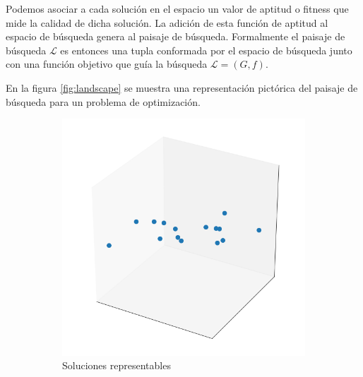 Podemos asociar a cada solución en el espacio un valor de aptitud o fitness que mide la calidad de dicha solución. La adición de esta función de aptitud al espacio de búsqueda genera al paisaje de búsqueda. Formalmente el paisaje de búsqueda $\mathcal{L}$ es entonces una tupla conformada por el espacio de búsqueda junto con una función objetivo que guía la búsqueda $\mathcal{L}=(G,f)$.

En la figura \ref{fig:landscape} se muestra una representación pictórica del paisaje de búsqueda para un problema de optimización.

\begin{figure}
\begin{subfigure}{.4\textwidth}
    \includegraphics[scale=.5]{Imagenes/search1.png}
    \caption{Soluciones representables}
\end{subfigure}
\begin{subfigure}{.5\textwidth}

\end{subfigure}
\end{figure}

